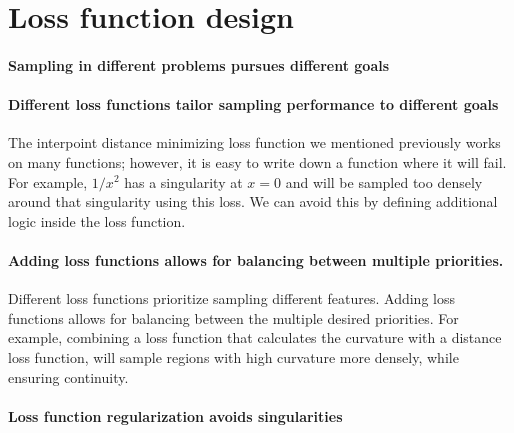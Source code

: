 \hypertarget{loss-function-design}{%
\section{Loss function design}\label{loss-function-design}}

\hypertarget{sampling-in-different-problems-pursues-different-goals}{%
\paragraph{Sampling in different problems pursues different goals}\label{sampling-in-different-problems-pursues-different-goals}}

\hypertarget{different-loss-functions-tailor-sampling-performance-to-different-goals}{%
\paragraph{Different loss functions tailor sampling performance to different goals}\label{different-loss-functions-tailor-sampling-performance-to-different-goals}}

The interpoint distance minimizing loss function we mentioned previously works on many functions; however, it is easy to write down a function where it will fail.
For example, $1/x^2$ has a singularity at $x=0$ and will be sampled too densely around that singularity using this loss.
We can avoid this by defining additional logic inside the loss function.

\hypertarget{adding-loss-functions-allows-for-balancing-between-multiple-priorities.}{%
\paragraph{Adding loss functions allows for balancing between multiple priorities.}\label{adding-loss-functions-allows-for-balancing-between-multiple-priorities.}}

Different loss functions prioritize sampling different features.
Adding loss functions allows for balancing between the multiple desired priorities.
For example, combining a loss function that calculates the curvature with a distance loss function, will sample regions with high curvature more densely, while ensuring continuity.

\hypertarget{loss-function-regularization-avoids-singularities}{%
\paragraph{Loss function regularization avoids singularities}\label{loss-function-regularization-avoids-singularities}}

